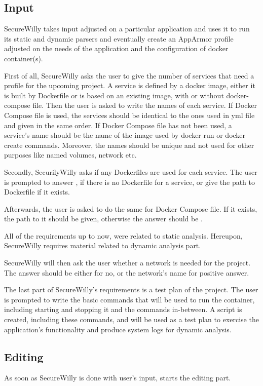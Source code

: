 \subsection{Input}
SecureWilly takes input adjusted on a particular application and uses it to run its static and dynamic parsers and eventually create an AppArmor profile adjusted on the needs of the application and the configuration of docker container(s).

First of all, SecureWilly asks the user to give the number of services that need a profile for the upcoming project. A service is defined by a docker image, either it is built by Dockerfile or is based on an existing image, with or without docker-compose file. Then the user is asked to write the names of each service. If Docker Compose file is used, the services should be identical to the ones used in yml file and given in the same order. If Docker Compose file has not been used, a service's name should be the name of the image used by docker run or docker create commands. Moreover, the names should be unique and not used for other purposes like named volumes, network etc.

Secondly, SecurilyWilly asks if any Dockerfiles are used for each service. The user is prompted to answer , if there is no Dockerfile for a service, or give the path to Dockerfile if it exists.

Afterwards, the user is asked to do the same for Docker Compose file. If it exists, the path to it should be given, otherwise the answer should be .

All of the requirements up to now, were related to static analysis. Hereupon, SecureWilly requires material related to dynamic analysis part.

SecureWilly will then ask the user whether a network is needed for the project. The answer should be either  for no, or the network's name for positive answer.

The last part of SecureWilly's requirements is a test plan of the project. The user is prompted to write the basic commands that will be used to run the container, including starting and stopping it and the commands in-between. A script is created, including these commands, and will be used as a test plan to exercise the application's functionality and produce system logs for dynamic analysis.

\subsection{Editing}
As soon as SecureWilly is done with user's input, starts the editing part.

